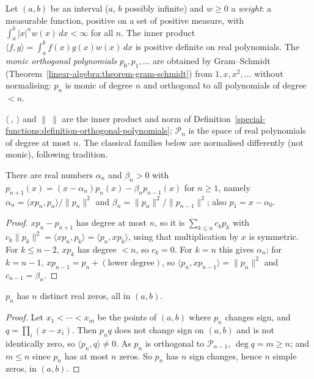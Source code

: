 \begin{definition}\label{special-functions:definition-orthogonal-polynomials}
Let $(a, b)$ be an interval ($a$, $b$ possibly infinite) and $w \geq 0$ a \emph{weight}: a measurable function, positive on a set of positive measure, with $\int_a^b|x|^nw(x)\,dx < \infty$ for all $n$. The inner product
$\langle f, g\rangle = \int_a^bf(x)g(x)w(x)\,dx$ is positive definite on real polynomials. The \emph{monic orthogonal polynomials} $p_0, p_1, \ldots$ are obtained by Gram--Schmidt
(Theorem~\ref{linear-algebra:theorem-gram-schmidt}) from $1, x, x^2, \ldots$ without normalising: $p_n$ is monic of degree $n$ and orthogonal to all polynomials of degree $< n$.
\end{definition}

\begin{notation}\label{special-functions:notation-orthogonal}
$\langle\ ,\ \rangle$ and $\|\ \|$ are the inner product and norm of Definition~\ref{special-functions:definition-orthogonal-polynomials}; $\mathcal{P}_n$ is the space of real polynomials of degree at most $n$. The classical
families below are normalised differently (not monic), following tradition.
\end{notation}

\begin{theorem}\label{special-functions:theorem-three-term}
There are real numbers $\alpha_n$ and $\beta_n > 0$ with $p_{n+1}(x) = (x - \alpha_n)p_n(x) - \beta_np_{n-1}(x)$ for $n \geq 1$, namely $\alpha_n = \langle xp_n, p_n\rangle/\|p_n\|^2$ and $\beta_n = \|p_n\|^2/\|p_{n-1}\|^2$;
also $p_1 = x - \alpha_0$.
\end{theorem}

\begin{proof}
$xp_n - p_{n+1}$ has degree at most $n$, so it is $\sum_{k \leq n}c_kp_k$ with $c_k\|p_k\|^2 = \langle xp_n, p_k\rangle = \langle p_n, xp_k\rangle$, using that multiplication by $x$ is symmetric. For $k \leq n - 2$, $xp_k$ has
degree $< n$, so $c_k = 0$. For $k = n$ this gives $\alpha_n$; for $k = n - 1$, $xp_{n-1} = p_n + (\text{lower degree})$, so $\langle p_n, xp_{n-1}\rangle = \|p_n\|^2$ and $c_{n-1} = \beta_n$.
\end{proof}

\begin{theorem}\label{special-functions:theorem-zeros}
$p_n$ has $n$ distinct real zeros, all in $(a, b)$.
\end{theorem}

\begin{proof}
Let $x_1 < \cdots < x_m$ be the points of $(a, b)$ where $p_n$ changes sign, and $q = \prod_i(x - x_i)$. Then $p_nq$ does not change sign on $(a, b)$ and is not identically zero, so $\langle p_n, q\rangle \neq 0$. As $p_n$ is
orthogonal to $\mathcal{P}_{n-1}$, $\deg q = m \geq n$; and $m \leq n$ since $p_n$ has at most $n$ zeros. So $p_n$ has $n$ sign changes, hence $n$ simple zeros, in $(a, b)$.
\end{proof}

